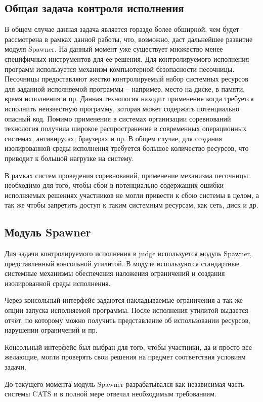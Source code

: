 \documentclass{imcs}
\begin{document}
\subsection{Общая задача контроля исполнения}
В общем случае данная задача является гораздо более обширной, чем будет рассмотрена в рамках данной работы, что, возможно, даст дальнейшее развитие модуля Spawner.
На данный момент уже существует множество менее специфичных инструментов для ее решения.
Для контролируемого исполнения программ используется механизм компьютерной безопасности песочницы\cite{sandboxing_def}.
Песочницы предоставляют жестко контролируемый набор системных ресурсов для заданной исполняемой программы -- например, место на диске, в памяти, время исполнения и пр.
Данная технология находит применение когда требуется исполнить неизвестную программу, которая может содержать потенциально опасный код.
Помимо применения в системах организации соревнований технология получила широкое распространение в современных операционных системах, антивирусах, браузерах и пр\cite{sandboxing_def}.
В общем случае, для создания изолированной среды исполнения требуется большое количество ресурсов, что приводит к большой нагрузке на систему.

В рамках систем проведения соревнований, применение механизма песочницы необходимо для того, чтобы сбои в потенциально содержащих ошибки исполняемых решениях участников не могли привести к сбою системы в целом, а так же чтобы запретить доступ к таким системным ресурсам, как сеть, диск и др.

\subsection{Модуль Spawner}
Для задачи контролируемого исполнения в judge используется модуль Spawner, представленный консольной утилитой\cite{prototype}.
В модуле используются стандартные системные механизмы обеспечения наложения ограничений и создания изолированной среды исполнения.

Через консольный интерфейс задаются накладываемые ограничения а так же опции запуска исполняемой программы.
После исполнения утилитой выдается отчёт, по которому можно получить представление об использовании ресурсов, нарушении ограничений и пр.

Консольный интерфейс был выбран для того, чтобы участники, да и просто все желающие, могли проверять свои решения на предмет соответствия условиям задачи.

До текущего момента модуль Spawner разрабатывался как независимая часть системы CATS и в полной мере отвечал необходимым требованиям.
\end{document}
